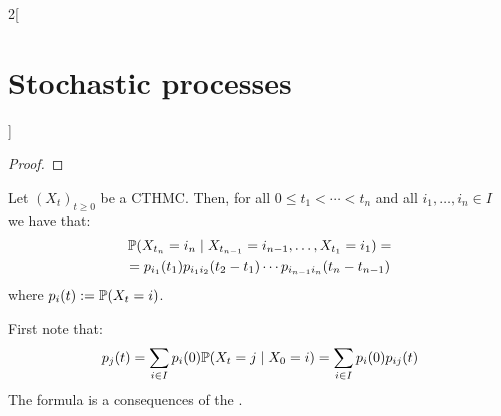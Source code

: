 \documentclass[../../../main_math.tex]{subfiles}
\begin{document}
\begin{multicols}{2}[\section{Stochastic processes}]
\begin{proof}
  \end{proof}
  \begin{proposition}
    Let ${(X_t)}_{t\geq 0}$ be a CTHMC. Then, for all $0\leq t_1 < \cdots < t_n$ and all $i_1,\ldots,i_{n}\in I$ we have that:
    \begin{multline*}
      \mathbb{P}(X_{t_n}=i_n\mid X_{t_{n-1}}=i_{n-1},\ldots,X_{t_1}=i_1)=\\
      =p_{i_1}(t_1)p_{i_1i_2}(t_2-t_1)\cdots p_{i_{n-1}i_n}(t_n-t_{n-1})
    \end{multline*}
    where $p_{i}(t):= \mathbb{P}(X_t=i)$.
  \end{proposition}
  \begin{sproof}
    First note that:
    $$
      p_j(t)=\sum_{i\in I}p_i(0)\mathbb{P}(X_t=j\mid X_0=i)=\sum_{i\in I}p_i(0)p_{ij}(t)
    $$
    The formula is a consequences of the .
  \end{sproof}

\end{multicols}
\end{document}
